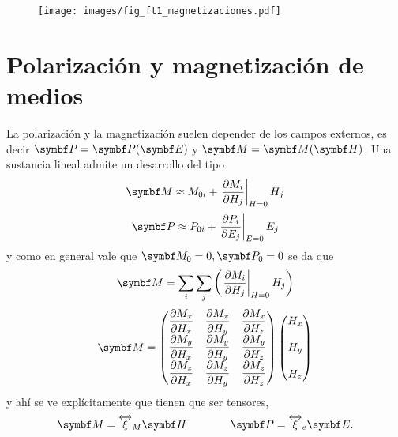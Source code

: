 \documentclass[10pt,oneside]{CBFT_book}
\begin{document}

\begin{figure}[htb]
	\begin{center}
	\texttt{[image: images/fig\_ft1\_magnetizaciones.pdf]}	 
	\end{center}
	\caption{}
\end{figure}


\section{Polarización y magnetización de medios}

La polarización y la magnetización suelen depender de los campos externos, es decir 
$\vb{P}=\vb{P}(\vb{E})$ y $\vb{M}=\vb{M}(\vb{H})$.
Una sustancia lineal admite un desarrollo del tipo
\[
	\vb{M} \approx M_{0i} + \left.\dpar{M_i}{H_j}\right|_{H=0} H_j
\]
\[
	\vb{P} \approx P_{0i} + \left.\dpar{P_i}{E_j}\right|_{E=0} E_j
\]
y como en general vale que $\vb{M}_0=0, \vb{P}_0=0$  se da que 
\[
	\vb{M} = \sum_i \sum_j \left( \left.\dpar{M_i}{H_j}\right|_{H=0} H_j \right) 
\]
\[
	\vb{M} = 
	\begin{pmatrix}
	 \displaystyle{\dpar{M_x}{H_x}} & \displaystyle{\dpar{M_x}{H_y}} & \displaystyle{\dpar{M_x}{H_z}} \\
	 \displaystyle{\dpar{M_y}{H_x}} & \displaystyle{\dpar{M_y}{H_y}} & \displaystyle{\dpar{M_y}{H_z}} \\
	 \displaystyle{\dpar{M_z}{H_x}} & \displaystyle{\dpar{M_z}{H_y}} & \displaystyle{\dpar{M_z}{H_z}}
	\end{pmatrix}
	\begin{pmatrix}
	 \displaystyle{H_x} \\
	 \\
	 H_y \\
	 \\
	 H_z
	\end{pmatrix}
\]
y ahí se ve explícitamente que tienen que ser tensores,
\[
	\vb{M} = \overleftrightarrow{\xi}_M \vb{H} \qquad\qquad 
	\vb{P} =  \overleftrightarrow{\xi}_e \vb{E}.
\]
\end{document}

